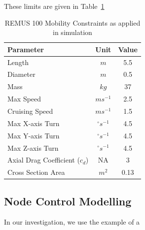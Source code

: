 \documentclass[conference]{IEEEtran}
\begin{document}
These limits are given in Table~\ref{tab:mobility_sysconstraints}
\begin{table}[h]
  \caption{REMUS 100 Mobility Constraints as applied in simulation} \label{tab:mobility_sysconstraints}
  \begin{center}
    \setlength{\tabcolsep}{8pt}
    \begin{tabular}{lcc}
      \toprule
      Parameter & Unit & Value \\
      \midrule
      Length & $m$ & 5.5\\
      Diameter & $m$ & 0.5\\
      Mass & $kg$ & 37 \\ 
      Max Speed & $ms^{-1}$ & 2.5\\
      Cruising Speed & $ms^{-1}$ & 1.5\\
      Max X-axis Turn & $^{\circ} s^{-1}$ & 4.5\\
      Max Y-axis Turn & $^{\circ} s^{-1}$ & 4.5\\
      Max Z-axis Turn & $^{\circ} s^{-1}$ & 4.5\\
      Axial Drag Coefficient ($c_d$) & NA & 3\\
      Cross Section Area & $m^2$ & 0.13\\

      \bottomrule
    \end{tabular}
    \setlength{\tabcolsep}{6pt}
  \end{center}
\end{table}

\subsection{Node Control Modelling}

In our investigation, we use the example of a 
\end{document}
